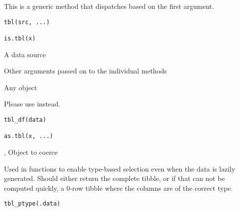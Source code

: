 \documentclass[a4paper]{book}
\begin{document}
%
\begin{Description}
This is a generic method that dispatches based on the first argument.
\end{Description}
%
\begin{Usage}
\begin{verbatim}
tbl(src, ...)

is.tbl(x)
\end{verbatim}
\end{Usage}
%
\begin{Arguments}
\begin{ldescription}
\item[\code{src}] A data source

\item[\code{...}] Other arguments passed on to the individual methods

\item[\code{x}] Any object
\end{ldescription}
\end{Arguments}
%
\begin{Description}
\strong{[Deprecated]}
Please use  instead.
\end{Description}
%
\begin{Usage}
\begin{verbatim}
tbl_df(data)

as.tbl(x, ...)
\end{verbatim}
\end{Usage}
%
\begin{Arguments}
\begin{ldescription}
\item[\code{data}, \code{x}] Object to coerce
\end{ldescription}
\end{Arguments}
%
\begin{Description}
Used in  functions to enable type-based selection even when the data
is lazily generated. Should either return the complete tibble, or if that
can not be computed quickly, a 0-row tibble where the columns are of
the correct type.
\end{Description}
%
\begin{Usage}
\begin{verbatim}
tbl_ptype(.data)
\end{verbatim}
\end{Usage}
\end{document}
